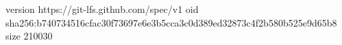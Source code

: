 version https://git-lfs.github.com/spec/v1
oid sha256:b740734516cfac30f73697e6e3b5cca3c0d389ed32873c4f2b580b525e9d65b8
size 210030
